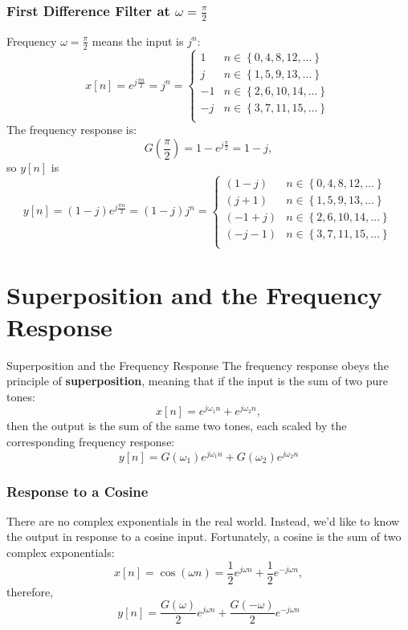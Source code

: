 \documentclass{beamer}
\begin{document}
\begin{frame}
  \frametitle{First Difference Filter at $\omega=\frac{\pi}{2}$}
  Frequency $\omega=\frac{\pi}{2}$ means the input is $j^n$:
  \[
  x[n] = e^{j\frac{\pi n}{2}} = j^n= \begin{cases}
    1 & n\in\left\{0,4,8,12,\ldots\right\}\\
    j & n\in\left\{1,5,9,13,\ldots\right\}\\
    -1 & n\in\left\{2,6,10,14,\ldots\right\}\\
    -j & n\in\left\{3,7,11,15,\ldots\right\}\\
  \end{cases}
  \]
  The frequency response is:
  \[
  G\left(\frac{\pi}{2}\right) = 1-e^{j\frac{\pi}{2}} = 1 - j,
  \]
  so $y[n]$ is
  \[
  y[n] = (1-j) e^{j\frac{\pi n}{2}} = (1-j) j^n= \begin{cases}
    (1-j) & n\in\left\{0,4,8,12,\ldots\right\}\\
    (j+1) & n\in\left\{1,5,9,13,\ldots\right\}\\
    (-1+j) & n\in\left\{2,6,10,14,\ldots\right\}\\
    (-j-1) & n\in\left\{3,7,11,15,\ldots\right\}\\
  \end{cases}
  \]
\end{frame}

\section[Superposition]{Superposition and the Frequency Response}
\setcounter{subsection}{1}

\begin{frame}
  \begin{block}{Superposition and the Frequency Response}
    The frequency response obeys the principle of {\bf superposition}, meaning that
    if the input is the sum of two pure tones:
    \[
    x[n] = e^{j\omega_1 n} + e^{j\omega_2 n},
    \]
    then the output is the sum of the same two tones, each scaled by
    the corresponding frequency response:
    \[
    y[n] = G(\omega_1)e^{j\omega_1 n}+G(\omega_2)e^{j\omega_2 n}
    \]
  \end{block}
\end{frame}

\begin{frame}
  \frametitle{Response to a Cosine}
  There are no  complex exponentials in the real world.  Instead, we'd like to know
  the output in response to a cosine input.  Fortunately, a cosine
  is the sum of two complex exponentials:
  \[
  x[n] = \cos(\omega n) = \frac{1}{2}e^{j\omega n}+\frac{1}{2}e^{-j\omega n},
  \]
  therefore,
  \[
  y[n] = \frac{G(\omega)}{2}e^{j\omega n}+\frac{G(-\omega)}{2}e^{-j\omega n}
  \]
\end{frame}
\end{document}
